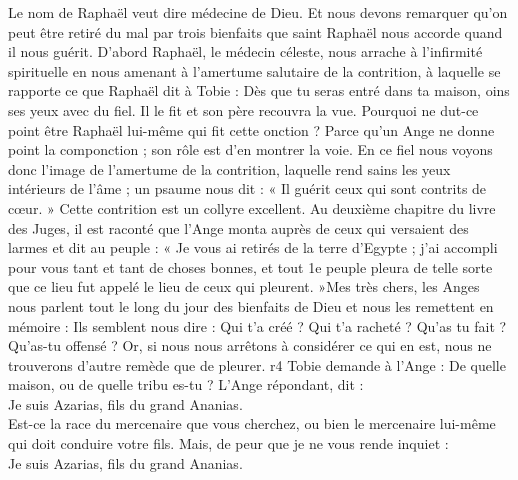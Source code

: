 \documentclass[twoside]{article}
\begin{document}
\begin{paracol}[1]{2}
{		Le nom de Raphaël veut dire médecine de Dieu. Et nous devons remarquer qu’on peut être retiré du mal par trois bienfaits que saint Raphaël nous accorde quand il nous guérit. D’abord Raphaël, le médecin céleste, nous arrache à l’infirmité spirituelle en nous amenant à l’amertume salutaire de la contrition, à laquelle se rapporte ce que Raphaël dit à Tobie : Dès que tu seras entré dans ta maison, oins ses yeux avec du fiel. Il le fit et son père recouvra la vue. Pourquoi ne dut-ce point être Raphaël lui-même qui fit cette onction ? Parce qu’un Ange ne donne point la componction ; son rôle est d’en montrer la voie. En ce fiel nous voyons donc l’image de l’amertume de la contrition, laquelle rend sains les yeux intérieurs de l’âme ; un psaume nous dit : « Il guérit ceux qui sont contrits de cœur. » Cette contrition est un collyre excellent. Au deuxième chapitre du livre des Juges, il est raconté que l’Ange monta auprès de ceux qui versaient des larmes et dit au peuple : « Je vous ai retirés de la terre d’Egypte ; j’ai accompli pour vous tant et tant de choses bonnes, et tout 1e peuple pleura de telle sorte que ce lieu fut appelé le lieu de ceux qui pleurent. »Mes très chers, les Anges nous parlent tout le long du jour des bienfaits de Dieu et nous les remettent en mémoire : Ils semblent nous dire : Qui t’a créé ? Qui t’a racheté ? Qu’as tu fait ? Qu’as-tu offensé ? Or, si nous nous arrêtons à considérer ce qui en est, nous ne trouverons d’autre remède que de pleurer.
	}
	{r4}
	{\pagebreak
	\rr Tobie demande à l’Ange : De quelle maison, ou de quelle tribu es-tu ? L’Ange répondant, dit :\\
	\GreSpecial{*} Je suis Azarias, fils du grand Ananias.\\
	\vv Est-ce la race du mercenaire que vous cherchez, ou bien le mercenaire lui-même qui doit conduire votre fils. Mais, de peur que je ne vous rende inquiet :\\
	\GreSpecial{*} Je suis Azarias, fils du grand Ananias.}


\end{paracol}
\end{document}

